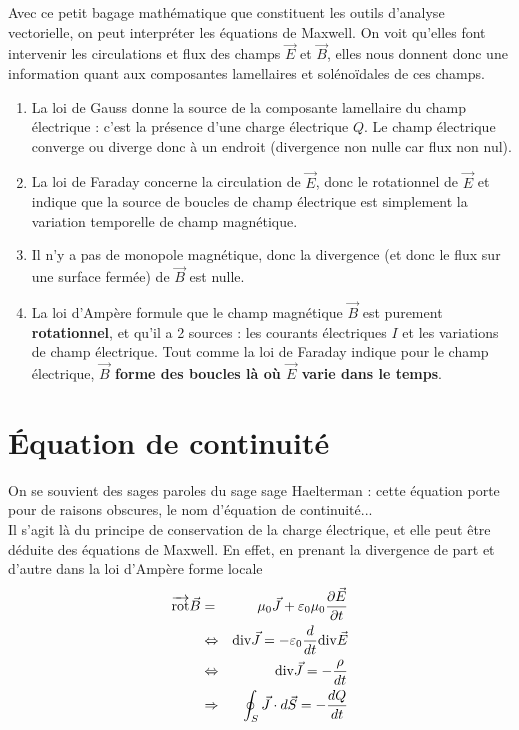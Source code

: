 \documentclass[12pt]{book}
\begin{document}
  \begin{wrapfigure}[8]{r}{0.6\textwidth} 
  \vspace{-1cm}\maxwell
  \end{wrapfigure}
 Avec ce petit bagage mathématique que constituent les outils d'analyse vectorielle, on peut interpréter les équations de Maxwell. On voit qu'elles font intervenir les circulations et flux des champs $\vec{E}$ et $\vec{B}$, elles nous donnent donc une information quant aux composantes lamellaires et solénoïdales de ces champs. \\
 \begin{enumerate}
 \item La loi de Gauss donne la source de la composante lamellaire du champ électrique : c'est la présence d'une charge électrique $Q$. Le champ électrique converge ou diverge donc à un endroit (divergence non nulle car flux non nul).
 \item La loi de Faraday concerne la circulation de $\vec{E}$, donc le rotationnel de $\vec{E}$ et indique que la source de boucles de champ électrique est simplement la variation temporelle de champ magnétique.
 \item Il n'y a pas de monopole magnétique, donc la divergence (et donc le flux sur une surface fermée) de $\vec{B}$ est nulle.
 \item La loi d'Ampère formule que le champ magnétique $\vec{B}$ est purement \textbf{rotationnel}, et qu'il a 2 sources : les courants électriques $I$ et les variations de champ électrique. Tout comme la loi de Faraday indique pour le champ électrique, \textbf{$\vec{B}$ forme des boucles là où $\vec{E}$ varie dans le temps}.
 \end{enumerate}
 \section{Équation de continuité}
 On se souvient des sages paroles du sage sage Haelterman : cette équation porte pour de raisons obscures, le nom d'équation de continuité... \\
 
Il s'agit là du principe de conservation de la charge électrique, et elle peut être déduite des équations de Maxwell. En effet, en prenant la divergence de part et d'autre dans la loi d'Ampère forme locale 
\begin{eqnarray*}
\overrightarrow{\text{rot}} \vec{B} &=& \mu_0 \vec{J} + \varepsilon_0 \mu_0 \dfrac{\partial \vec{E}}{\partial t} \\
& \Leftrightarrow & \text{div}\vec{J} = -\varepsilon_0 \dfrac{d}{dt} \text{div}\vec{E} \\
&\Leftrightarrow & \text{div}\vec{J} = -\dfrac{ \rho}{dt} \\
&\Rightarrow & \oint_S \vec{J} \cdot d\vec{S} = -\dfrac{dQ}{dt}
\end{eqnarray*}
\end{document}
